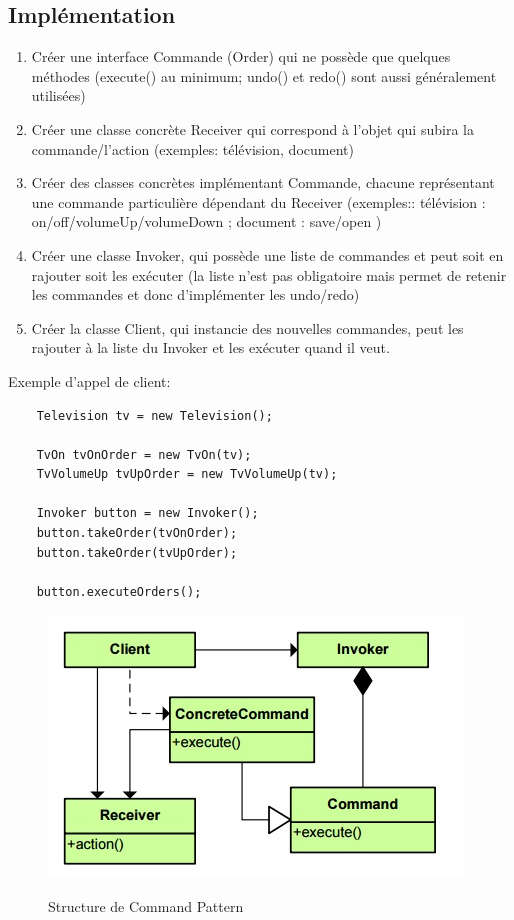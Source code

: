\subsection{Implémentation}
\begin{enumerate}
    \item Créer une interface Commande (Order) qui ne possède que quelques méthodes (execute() au minimum; undo() et redo() sont aussi généralement utilisées)
    \item Créer une classe concrète Receiver qui correspond à l’objet qui subira la commande/l’action (exemples: télévision, document)
    \item Créer des classes concrètes implémentant Commande, chacune représentant une commande particulière dépendant du Receiver (exemples:: télévision : on/off/volumeUp/volumeDown ; document : save/open )
    \item Créer une classe Invoker, qui possède une liste de commandes et peut soit en rajouter soit les exécuter (la liste n'est pas obligatoire mais permet de retenir les commandes et donc d'implémenter les undo/redo)
    \item Créer la classe Client, qui instancie des nouvelles commandes, peut les rajouter à la liste du Invoker et les exécuter quand il veut.

\end{enumerate}
\newpage
Exemple d'appel de client: 
\begin{lstlisting}
    Television tv = new Television();

    TvOn tvOnOrder = new TvOn(tv);
    TvVolumeUp tvUpOrder = new TvVolumeUp(tv);
    
    Invoker button = new Invoker();
    button.takeOrder(tvOnOrder);
    button.takeOrder(tvUpOrder);
    
    button.executeOrders();
\end{lstlisting}


\begin{figure}[H]
	\centering
	\begin{minipage}[t]{8.0cm}
		\includegraphics[scale=0.7]{Images/comm.jpg}
		\label{s1}
   		\caption{Structure de Command Pattern}
	\end{minipage}
	
\end{figure}

